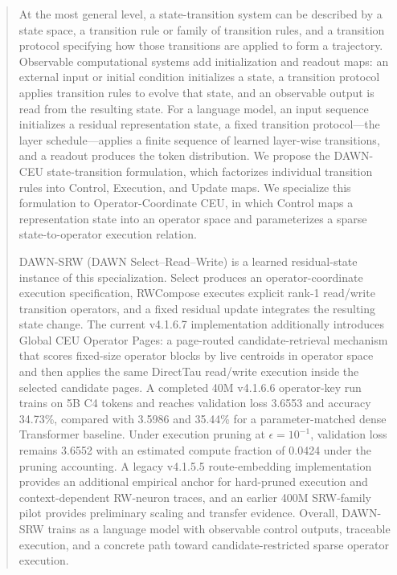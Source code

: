 \documentclass{article}
\begin{document}
\begin{abstract}
At the most general level, a state-transition system can be described by a state space, a transition rule or family of transition rules, and a transition protocol specifying how those transitions are applied to form a trajectory. Observable computational systems add initialization and readout maps: an external input or initial condition initializes a state, a transition protocol applies transition rules to evolve that state, and an observable output is read from the resulting state. For a language model, an input sequence initializes a residual representation state, a fixed transition protocol---the layer schedule---applies a finite sequence of learned layer-wise transitions, and a readout produces the token distribution. We propose the DAWN-CEU state-transition formulation, which factorizes individual transition rules into Control, Execution, and Update maps. We specialize this formulation to Operator-Coordinate CEU, in which Control maps a representation state into an operator space and parameterizes a sparse state-to-operator execution relation.

DAWN-SRW (DAWN Select--Read--Write) is a learned residual-state instance of this specialization. Select produces an operator-coordinate execution specification, RWCompose executes explicit rank-1 read/write transition operators, and a fixed residual update integrates the resulting state change. The current v4.1.6.7 implementation additionally introduces Global CEU Operator Pages: a page-routed candidate-retrieval mechanism that scores fixed-size operator blocks by live centroids in operator space and then applies the same DirectTau read/write execution inside the selected candidate pages. A completed 40M v4.1.6.6 operator-key run trains on 5B C4 tokens and reaches validation loss 3.6553 and accuracy 34.73\%, compared with 3.5986 and 35.44\% for a parameter-matched dense Transformer baseline. Under execution pruning at \(\epsilon=10^{-1}\), validation loss remains 3.6552 with an estimated compute fraction of 0.0424 under the pruning accounting. A legacy v4.1.5.5 route-embedding implementation provides an additional empirical anchor for hard-pruned execution and context-dependent RW-neuron traces, and an earlier 400M SRW-family pilot provides preliminary scaling and transfer evidence. Overall, DAWN-SRW trains as a language model with observable control outputs, traceable execution, and a concrete path toward candidate-restricted sparse operator execution.
\end{abstract}
\end{document}

